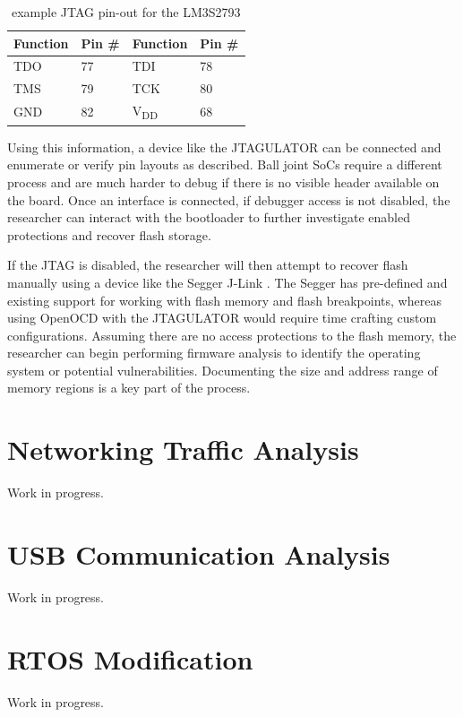 \begin{table}[H]
  \centering
  \begin{tabular}{|p{3cm}|p{3cm}|p{3cm}|p{3cm}|}

    

    \hline\rowcolor{gray!30}
    \textbf{Function} & \textbf{Pin \#} & \textbf{Function} & \textbf{Pin \#}  \\
    \hline

    TDO & 77 & TDI & 78 \\
    \hline

    TMS & 79 & TCK & 80 \\
    \hline

    GND & 82 & V\textsubscript{DD} & 68 \\
    \hline

  \end{tabular}
  \caption{example JTAG pin-out for the LM3S2793}
  \label{table:example_jtag_pinout}%
\end{table}

Using this information, a device like the JTAGULATOR \autocite{JTAGulator2023} can be connected and enumerate or verify pin layouts as described. Ball joint SoCs require a different process and are much harder to debug if there is no visible header available on the board. Once an interface is connected, if debugger access is not disabled, the researcher can interact with the bootloader to further investigate enabled protections and recover flash storage.

If the JTAG is disabled, the researcher will then attempt to recover flash manually using a device like the Segger J-Link \autocite{SEGGERJLinkDebug}. The Segger has pre-defined and existing support for working with flash memory and flash breakpoints, whereas using OpenOCD with the JTAGULATOR would require time crafting custom configurations. Assuming there are no access protections to the flash memory, the researcher can begin performing firmware analysis to identify the operating system or potential vulnerabilities. Documenting the size and address range of memory regions is a key part of the process.

\section{Networking Traffic Analysis} \label{networkanalysis}

Work in progress.

\section{USB Communication Analysis} \label{usbcommanalysis}

Work in progress.

\section{RTOS Modification} \label{rtosmodification}

Work in progress.


